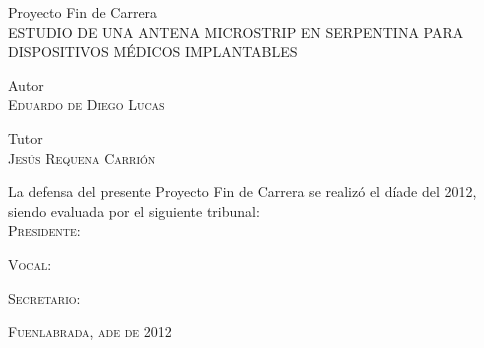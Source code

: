\begin{center}
{\normalsize Proyecto Fin de Carrera}
    \\
    \vspace{0.5cm}
    {\small \textsc{ESTUDIO DE UNA ANTENA MICROSTRIP EN SERPENTINA PARA DISPOSITIVOS MÉDICOS IMPLANTABLES}}
\end{center}

\begin{center}
{\normalsize Autor}
    \\
    {\normalsize \textsc{Eduardo de Diego Lucas}}\\
\end{center}

\begin{center}
{\normalsize Tutor}
    \\
    {\normalsize \textsc{Jesús Requena Carrión}}\\
\end{center}

\vspace{0.3cm} {La defensa del presente Proyecto Fin de Carrera se realizó el día\hspace{1cm}de\hspace{1cm}  del 2012, siendo evaluada por el siguiente tribunal:}\\

\vspace{0.3cm}
{\normalsize \textsc{Presidente:}} \vspace{0.6cm}
\begin{center}
    \textsc{}
\end{center}

{\normalsize \textsc{Vocal:}} \vspace{0.6cm}
\begin{center}
    \textsc{}
\end{center}

{\normalsize \textsc{Secretario:}} \vspace{0.6cm}
\begin{center}
    \textsc{}
\end{center}

\vspace{0.5cm} 
\vfill
\begin{flushright}
{\normalsize \textsc{Fuenlabrada, a\hspace{1cm}de\hspace{3cm} de 2012}}
\end{flushright}
